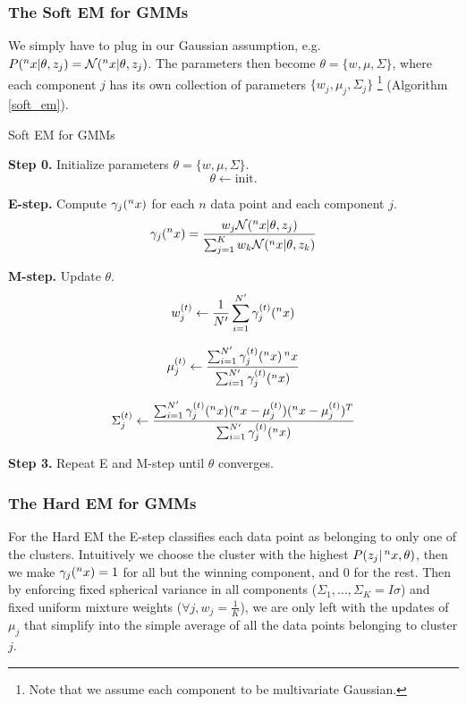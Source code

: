 \documentclass{article}
\begin{document}
\subsubsection{The Soft EM for GMMs}
We simply have to plug in our Gaussian assumption, e.g. $P( \prescript{n}{}{x} | \theta, z_j) = \mathcal{N}(\prescript{n}{}{x}|\theta, z_j)$. The parameters then become $\theta = \{w, \mu, \Sigma\}$, where each component $j$ has its own collection of parameters $\{w_j, \mu_j, \Sigma_j\}$ \footnote{Note that we assume each component to be multivariate Gaussian.} (Algorithm \ref{soft_em}).
 
\begin{algorithm}
\caption{Soft EM for GMMs} \label{soft_em}
\begin{algorithmic}
\State \textbf{Step 0.} Initialize parameters $\theta = \{w, \mu, \Sigma\}$.
$$
\theta \leftarrow \text{init.}
$$
 
\State \textbf{E-step.} Compute $\gamma_j(\prescript{n}{}{x})$ for each \(n\) data point and each component \(j\).
$$
\gamma_j(\prescript{n}{}{x}) = \frac{w_j\mathcal{N}(\prescript{n}{}{x}|\theta, z_j)}{\sum_{j=1}^K w_k \mathcal{N}(\prescript{n}{}{x}|\theta, z_k)}
$$
 
\State \textbf{M-step.} Update $\theta$.
\[
w_j^{(t)} \leftarrow \frac{1}{N'} \sum_{i=1}^{N'} \gamma_j^{(t)}(\prescript{n}{}{x})
\]
 
\[
\mu_j^{(t)} \leftarrow \frac{\sum_{i=1}^{N'} \gamma_j^{(t)}(\prescript{n}{}{x})\prescript{n}{}{x}}{\sum_{i=1}^{N'} \gamma_j^{(t)}(\prescript{n}{}{x})}
\]
 
\[
\Sigma_j^{(t)} \leftarrow \frac{\sum_{i=1}^{N'} \gamma_j^{(t)}(\prescript{n}{}{x})(\prescript{n}{}{x}-\mu_j^{(t)})(\prescript{n}{}{x}-\mu_j^{(t)})^T}{\sum_{i=1}^{N'} \gamma_j^{(t)}(\prescript{n}{}{x})}
\]
 
\State \textbf{Step 3.} Repeat E and M-step until \(\theta\) converges.
\end{algorithmic}
\end{algorithm}
 
\subsubsection{The Hard EM for GMMs}
 
For the Hard EM the E-step classifies each data point as belonging to
only one of the clusters. Intuitively we choose the cluster with the highest $P (z_j | \prescript{n}{}{x}, \theta)$, then we make $\gamma_j(\prescript{n}{}{x}) = 1$ for all but the winning component, and 0 for the rest. Then by enforcing fixed
spherical variance in all components ($\Sigma_1,...,\Sigma_K = I\sigma$) and fixed uniform mixture weights ($\forall j, w_j = \frac{1}{K}$), we are only left with the updates of $\mu_j$ that simplify into the simple average of all the data points belonging to cluster $j$.
 
\end{document}
